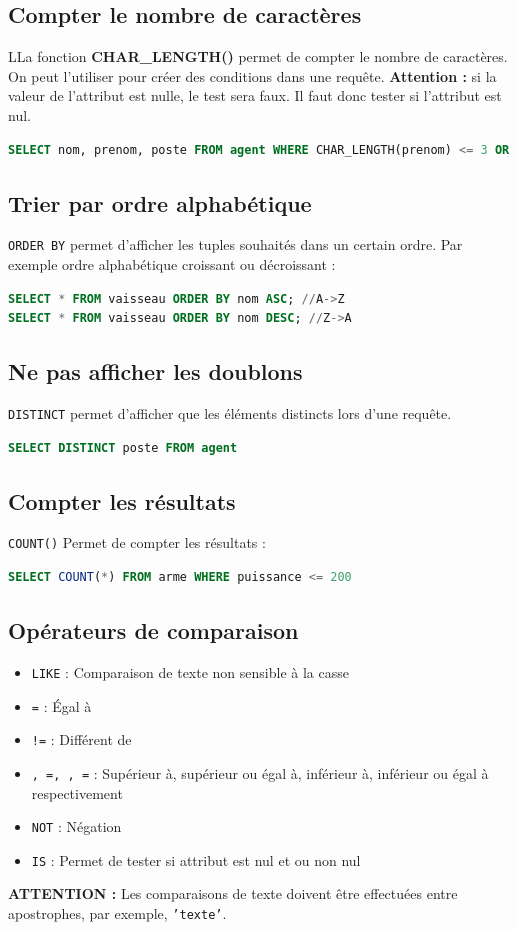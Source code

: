 \subsection{Compter le nombre de caractères}
LLa fonction \textbf{CHAR\_LENGTH()} permet de compter le nombre de caractères. On peut l'utiliser pour créer des conditions dans une requête. \textbf{Attention :} si la valeur de l'attribut est nulle, le test sera faux. Il faut donc tester si l'attribut est nul.
\begin{lstlisting}[language=SQL]
SELECT nom, prenom, poste FROM agent WHERE CHAR_LENGTH(prenom) <= 3 OR prenom IS NULL
\end{lstlisting}

\subsection{Trier par ordre alphabétique}
\texttt{ORDER BY} permet d'afficher les tuples souhaités dans un certain ordre. Par exemple ordre alphabétique croissant ou décroissant :
\begin{lstlisting}[language=SQL]
SELECT * FROM vaisseau ORDER BY nom ASC; //A->Z
SELECT * FROM vaisseau ORDER BY nom DESC; //Z->A
\end{lstlisting}

\subsection{Ne pas afficher les doublons}
\texttt{DISTINCT} permet d'afficher que les éléments distincts lors d'une requête.
\begin{lstlisting}[language=SQL]
SELECT DISTINCT poste FROM agent
\end{lstlisting}

\subsection{Compter les résultats}
\texttt{COUNT()} Permet de compter les résultats :
\begin{lstlisting}[language=SQL]
SELECT COUNT(*) FROM arme WHERE puissance <= 200
\end{lstlisting}

\subsection{Opérateurs de comparaison}
\begin{itemize}
    \item \texttt{LIKE} : Comparaison de texte non sensible à la casse
    \item \texttt{=} : Égal à
    \item \texttt{!=} : Différent de
    \item \texttt{\>, \>=, \<, \<=} : Supérieur à, supérieur ou égal à, inférieur à, inférieur ou égal à respectivement
    \item \texttt{NOT} : Négation
    \item \texttt{IS} : Permet de tester si attribut est nul et ou non nul
\end{itemize}
\textbf{ATTENTION :} Les comparaisons de texte doivent être effectuées entre apostrophes, par exemple, \texttt{'\<texte\>'}.


